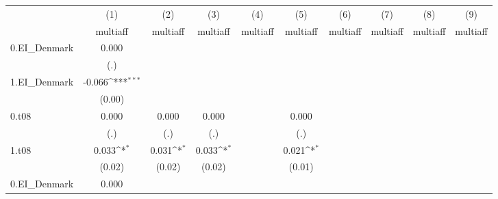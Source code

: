 {
\def\sym#1{\ifmmode^{#1}\else\(^{#1}\)\fi}
\begin{tabular}{l*{9}{c}}
\hline\hline
          &\multicolumn{1}{c}{(1)}&\multicolumn{1}{c}{(2)}&\multicolumn{1}{c}{(3)}&\multicolumn{1}{c}{(4)}&\multicolumn{1}{c}{(5)}&\multicolumn{1}{c}{(6)}&\multicolumn{1}{c}{(7)}&\multicolumn{1}{c}{(8)}&\multicolumn{1}{c}{(9)}\\
          &\multicolumn{1}{c}{multiaff}&\multicolumn{1}{c}{multiaff}&\multicolumn{1}{c}{multiaff}&\multicolumn{1}{c}{multiaff}&\multicolumn{1}{c}{multiaff}&\multicolumn{1}{c}{multiaff}&\multicolumn{1}{c}{multiaff}&\multicolumn{1}{c}{multiaff}&\multicolumn{1}{c}{multiaff}\\
\hline
0.EI\_Denmark&    0.000         &                  &                  &                  &                  &                  &                  &                  &                  \\
          &      (.)         &                  &                  &                  &                  &                  &                  &                  &                  \\
[1em]
1.EI\_Denmark&   -0.066\sym{***}&                  &                  &                  &                  &                  &                  &                  &                  \\
          &   (0.00)         &                  &                  &                  &                  &                  &                  &                  &                  \\
[1em]
0.t08     &    0.000         &    0.000         &    0.000         &                  &    0.000         &                  &                  &                  &                  \\
          &      (.)         &      (.)         &      (.)         &                  &      (.)         &                  &                  &                  &                  \\
[1em]
1.t08     &    0.033\sym{*}  &    0.031\sym{*}  &    0.033\sym{*}  &                  &    0.021\sym{*}  &                  &                  &                  &                  \\
          &   (0.02)         &   (0.02)         &   (0.02)         &                  &   (0.01)         &                  &                  &                  &                  \\
[1em]
0.EI\_Denmark#0.t08&    0.000         &                  &                  &                  &                  &                  &                  &                  &                  \\

\end{tabular}}
